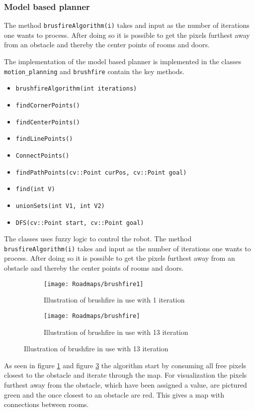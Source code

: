 \documentclass[../Head/Main.tex]{subfiles}
\begin{document}
\subsubsection{Model based planner}
The method \texttt{brusfireAlgorithm(i)} takes and input as the number of iterations one wants to process. After doing so it is possible to get the pixels furthest away from an obstacle and thereby the center points of rooms and doors.   

The implementation of the model based planner is implemented in the classes \texttt{motion\_planning} and \texttt{brushfire} contain the key methods.
\begin{itemize}
	\item \texttt{brushfireAlgorithm(int iterations)}
	\item \texttt{findCornerPoints()}
	\item \texttt{findCenterPoints()}
	\item \texttt{findLinePoints()}
	\item \texttt{ConnectPoints()}
	\item \texttt{findPathPoints(cv::Point curPos, cv::Point goal)}
	\item \texttt{find(int V)}
	\item \texttt{unionSets(int V1, int V2)}
	\item \texttt{DFS(cv::Point start, cv::Point goal)}
\end{itemize}
The classes uses fuzzy logic to control the robot. The method \texttt{brusfireAlgorithm(i)} takes and input as the number of iterations one wants to process. After doing so it is possible to get the pixels furthest away from an obstacle and thereby the center points of rooms and doors.   
\begin{figure}[H]
  \begin{subfigure}[b]{0.49\textwidth}
    \centering
    \texttt{[image: Roadmaps/brushfire1]}
    \caption{Illustration of brushfire in use with 1 iteration}
    \label{fig:Brushfire1}
  \end{subfigure}
  \hfill
   \begin{subfigure}[b]{0.49\textwidth}
    \centering
    \texttt{[image: Roadmaps/brushfire]}
    \caption{Illustration of brushfire in use with 13 iteration}
    \label{fig:Brusfire2}
  \end{subfigure}
  \end{figure}
  
As seen in figure \ref{fig:Brushfire1} and figure \ref{fig:Brusfire2} the algorithm start by consuming all free pixels closest to the obstacle and iterate through the map. For visualization the pixels furthest away from the obstacle, which have been assigned a value, are pictured green and the once closest to an obstacle are red. This gives a map with connections between rooms. 
  
\end{document}
